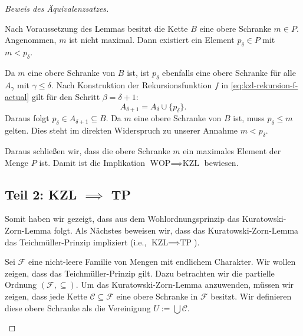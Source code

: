 \begin{proof}[Beweis des Äquivalenzsatzes]
\begin{math-stroke}
\begin{short-proof}
Nach Voraussetzung des Lemmas besitzt die Kette $B$ eine obere Schranke $m \in P$. Angenommen, $m$ ist nicht maximal. Dann existiert ein Element $p_\delta \in P$ mit $m < p_\delta$. 

Da $m$ eine obere Schranke von $B$ ist, ist $p_\delta$ ebenfalls eine obere Schranke für alle $A_\gamma$ mit $\gamma \le \delta$. Nach Konstruktion der Rekursionsfunktion $f$ in \eqref{eq:kzl-rekursion-f-actual} gilt für den Schritt $\beta = \delta + 1$:
\[
A_{\delta+1} = A_\delta \cup \{p_\delta\}.
\]
Daraus folgt $p_\delta \in A_{\delta+1} \subseteq B$. Da $m$ eine obere Schranke von $B$ ist, muss $p_\delta \le m$ gelten. Dies steht im direkten Widerspruch zu unserer Annahme $m < p_\delta$. 

Daraus schließen wir, dass die obere Schranke $m$ ein maximales Element der Menge $P$ ist. Damit ist die Implikation $\text{WOP} \implies \text{KZL}$ bewiesen.
\end{short-proof}
\end{math-stroke}

\subsection{Teil 2: KZL \texorpdfstring{$\implies$}{implies} TP}
\begin{spoken-clean}[01:24:00 - 01:26:34]
Somit haben wir gezeigt, dass aus dem Wohlordnungsprinzip das Kuratowski-Zorn-Lemma folgt. Als Nächstes beweisen wir, dass das Kuratowski-Zorn-Lemma das Teichmüller-Prinzip impliziert (i.e., $\text{KZL} \implies \text{TP}$).

Sei $\mathcal{F}$ eine nicht-leere Familie von Mengen mit endlichem Charakter. Wir wollen zeigen, dass das Teichmüller-Prinzip gilt. Dazu betrachten wir die partielle Ordnung $(\mathcal{F}, \subseteq)$. Um das Kuratowski-Zorn-Lemma anzuwenden, müssen wir zeigen, dass jede Kette $\mathcal{C} \subseteq \mathcal{F}$ eine obere Schranke in $\mathcal{F}$ besitzt. Wir definieren diese obere Schranke als die Vereinigung $U := \bigcup \mathcal{C}$.


\end{spoken-clean}
\end{proof}
